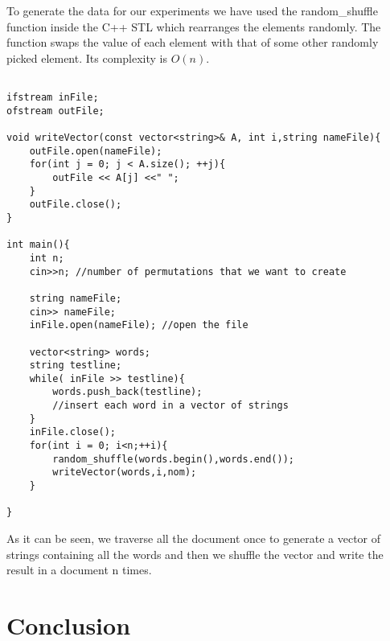 \documentclass[12pt]{article}
\begin{document}
To generate the data for our experiments we have used the random\_shuffle function inside the C++ STL which rearranges the elements randomly. The function swaps the value of each element with that of some other randomly picked element. Its complexity is $O(n)$. %

\begin{lstlisting}

ifstream inFile;
ofstream outFile;

void writeVector(const vector<string>& A, int i,string nameFile){
    outFile.open(nameFile);
    for(int j = 0; j < A.size(); ++j){
        outFile << A[j] <<" ";
    }
    outFile.close();
}

int main(){
    int n; 
    cin>>n; //number of permutations that we want to create
         
    string nameFile;
    cin>> nameFile; 
    inFile.open(nameFile); //open the file
    
    vector<string> words; 
    string testline;
    while( inFile >> testline){
    	words.push_back(testline); 
    	//insert each word in a vector of strings
    }
    inFile.close();
    for(int i = 0; i<n;++i){
    	random_shuffle(words.begin(),words.end()); 
    	writeVector(words,i,nom);
    }
    
}
\end{lstlisting}

As it can be seen, we traverse all the document once to generate a vector of strings containing all the words and then we shuffle the vector and write the result in a document n times. 
\section{Conclusion}


\newpage
\end{document}
